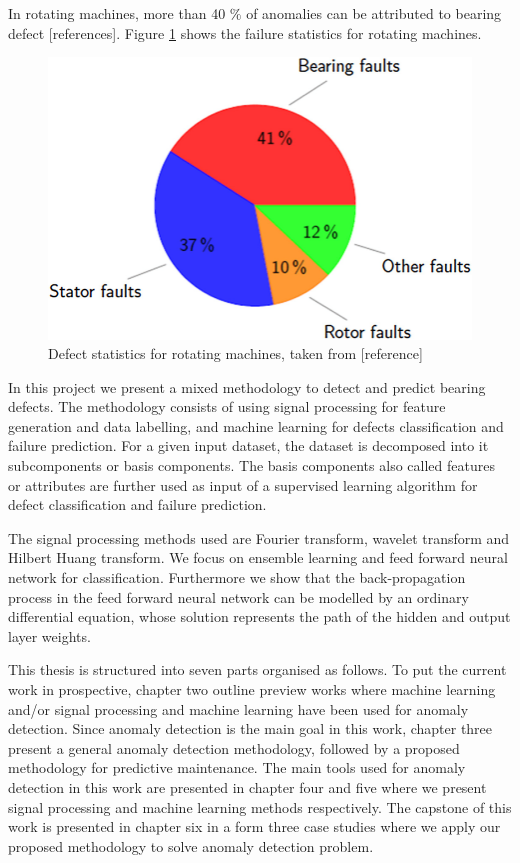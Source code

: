 \documentclass[11pt, oneside]{article}   	%
\begin{document}
\begin{flushleft}
In rotating machines, more than 40 $\%$ of anomalies can be attributed to bearing defect [references]. Figure \ref{fig:pie} shows the failure statistics for rotating machines. 
\end{flushleft}
\begin{figure}[H] %
   \centering
   \includegraphics[width=5in]{pie.png} 
   \caption{Defect statistics for rotating machines, taken from [reference]}
   \label{fig:pie}
\end{figure}
In this project we present a mixed methodology to detect and predict bearing defects. The methodology consists of using signal processing for feature generation and data labelling,  and machine learning for defects classification and failure prediction. For a given input dataset, the dataset is decomposed into it subcomponents or basis components. The basis components also called features or attributes are further used as input of a supervised learning algorithm for defect classification and failure prediction.
\begin{flushleft}
The signal processing methods used are Fourier transform, wavelet transform and Hilbert Huang transform. We focus on ensemble learning and feed forward neural network for classification. Furthermore we show that the back-propagation process in the feed forward neural network can be modelled by an ordinary differential equation, whose solution represents the path of the hidden and output layer weights.
\end{flushleft}
\justify
This thesis is structured into seven parts organised as follows. To put the current work in prospective, chapter two outline preview works where machine learning and/or signal processing and machine learning have been used for anomaly detection. Since anomaly detection is the main goal in this work, chapter three present a general anomaly detection methodology, followed by a proposed methodology for predictive maintenance. The main tools used for anomaly detection in this work are presented in chapter four and five where we present signal processing and machine learning methods respectively. The capstone of this work is presented in chapter six in a form three case studies where we apply our proposed methodology to solve anomaly detection problem.
\end{document}
